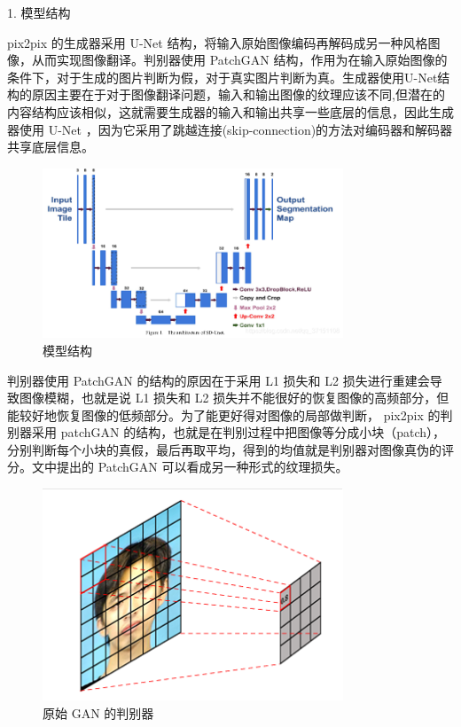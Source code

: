 1. 模型结构

pix2pix 的生成器采用 U-Net 结构，将输入原始图像编码再解码成另一种风格图像，从而实现图像翻译。判别器使用 PatchGAN 结构，作用为在输入原始图像的条件下，对于生成的图片判断为假，对于真实图片判断为真。生成器使用U-Net结构的原因主要在于对于图像翻译问题，输入和输出图像的纹理应该不同,但潜在的内容结构应该相似，这就需要生成器的输入和输出共享一些底层的信息，因此生成器使用 U-Net ，因为它采用了跳越连接(skip-connection)的方法对编码器和解码器共享底层信息。

\begin{figure}[htb]
\centering 
\includegraphics[width=0.8\textwidth]{img/m2t6.png} 
\caption{模型结构}
\label{Test}
\end{figure}

判别器使用 PatchGAN 的结构的原因在于采用 L1 损失和 L2 损失进行重建会导致图像模糊，也就是说 L1 损失和 L2 损失并不能很好的恢复图像的高频部分，但能较好地恢复图像的低频部分。为了能更好得对图像的局部做判断， pix2pix 的判别器采用 patchGAN 的结构，也就是在判别过程中把图像等分成小块（patch），分别判断每个小块的真假，最后再取平均，得到的均值就是判别器对图像真伪的评分。文中提出的 PatchGAN 可以看成另一种形式的纹理损失。

\begin{figure}[htb]
\centering 
\includegraphics[width=0.8\textwidth]{img/m2t7.png} 
\caption{原始 GAN 的判别器}
\label{Test}
\end{figure}


